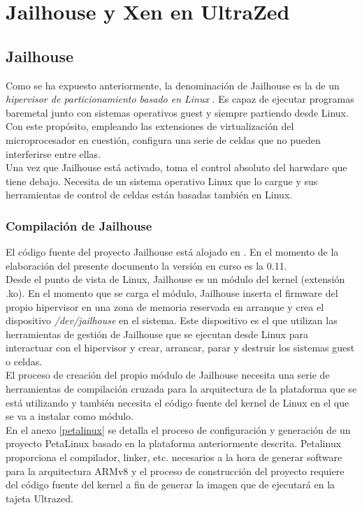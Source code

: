\chapter{Jailhouse y Xen en UltraZed}

\section{Jailhouse}
Como se ha expuesto anteriormente, la denominación de Jailhouse es la de un \textit{hipervisor de particionamiento basado en Linux} \cite{jailhouse_github}. Es capaz de ejecutar programas baremetal junto con sistemas operativos guest y siempre partiendo desde Linux. Con este propósito, empleando las extensiones de virtualización del microprocesador en cuestión, configura una serie de celdas que no pueden interferirse entre ellas.\\
Una vez que Jailhouse está activado, toma el control absoluto del harwdare que tiene debajo. Necesita de un sistema operativo Linux que lo cargue y sus herramientas de control de celdas están basadas también en Linux.

\subsection{Compilación de Jailhouse}
El código fuente del proyecto Jailhouse está alojado en \cite{jailhouse_github}. En el momento de la elaboración del presente documento la versión en curso es la 0.11.\\
Desde el punto de vista de Linux, Jailhouse es un módulo del kernel (extensión .ko). En el momento que se carga el módulo, Jailhouse inserta el firmware del propio hipervisor en una zona de memoria reservada en arranque y crea el dispositivo \textit{/dev/jailhouse} en el sistema. Este dispositivo es el que utilizan las herramientas de gestión de Jailhouse que se ejecutan desde Linux para interactuar con el hipervisor y crear, arrancar, parar y destruir los sistemas guest o celdas.\\

El proceso de creación del propio módulo de Jailhouse necesita una serie de herramientas de compilación cruzada para la arquitectura de la plataforma que se está utilizando y también necesita el código fuente del kernel de Linux en el que se va a instalar como módulo.\\
En el anexo \ref{petalinux} se detalla el proceso de configuración y generación de un proyecto PetaLinux basado en la plataforma anteriormente descrita. Petalinux proporciona el compilador, linker, etc. necesarios a la hora de generar software para la arquitectura ARMv8 y el proceso de construcción del proyecto requiere del código fuente del kernel a fin de generar la imagen que de ejecutará en la tajeta Ultrazed\texttrademark.\\

